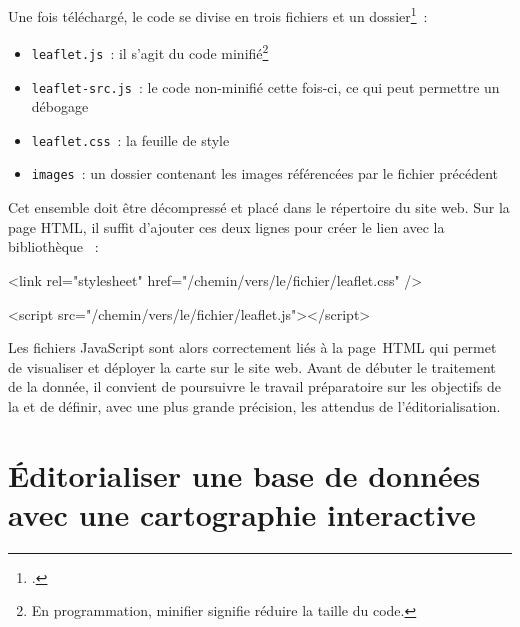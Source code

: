 Une fois téléchargé, le code se divise en trois fichiers et un dossier\footcite{agafonkin_leaflet_nodate}~: 
\begin{itemize}
	\item \texttt{leaflet.js}~: il s’agit du code minifié\footnote{En programmation, minifier signifie réduire la taille du code.}
	\item \texttt{leaflet-src.js}~: le code non-minifié cette fois-ci, ce qui peut permettre un débogage
	\item \texttt{leaflet.css}~: la feuille de style
	\item \texttt{images}~: un dossier contenant les images référencées par le fichier précédent\\
\end{itemize}

Cet ensemble doit être décompressé et placé dans le répertoire du site web. Sur la page HTML, il suffit d’ajouter ces deux lignes pour créer le lien avec la bibliothèque ~:\par
<link rel="stylesheet" href="/chemin/vers/le/fichier/leaflet.css" />\par
<script src="/chemin/vers/le/fichier/leaflet.js"></script> \\\par

Les fichiers JavaScript sont alors correctement liés à la page~HTML qui permet de visualiser et déployer la carte sur le site web. Avant de débuter le traitement de la donnée, il convient de poursuivre le travail préparatoire sur les objectifs de la  et de définir, avec une plus grande précision, les attendus de l’éditorialisation.\newpage

\section{Éditorialiser une base de données avec une cartographie interactive}

